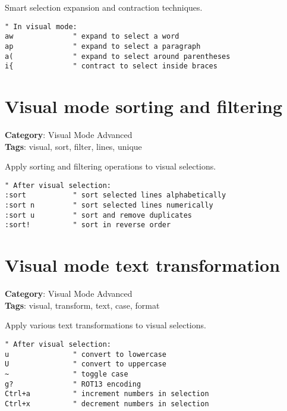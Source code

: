 {{{{{{{{{{{{{{{{{{Smart selection expansion and contraction techniques.

\begin{Exa*}{}
\begin{Verbatim}[fontsize=\footnotesize, breaklines, breakanywhere]
" In visual mode:
aw              " expand to select a word
ap              " expand to select a paragraph
a(              " expand to select around parentheses
i{              " contract to select inside braces
\end{Verbatim}
\end{Exa*}

\section{Visual mode sorting and filtering}

\textbf{Category}: Visual Mode Advanced\\ \textbf{Tags}: visual, sort, filter, lines, unique
\vspace{0.5cm}

Apply sorting and filtering operations to visual selections.

\begin{Exa*}{}
\begin{Verbatim}[fontsize=\footnotesize, breaklines, breakanywhere]
" After visual selection:
:sort           " sort selected lines alphabetically
:sort n         " sort selected lines numerically
:sort u         " sort and remove duplicates
:sort!          " sort in reverse order
\end{Verbatim}
\end{Exa*}

\section{Visual mode text transformation}

\textbf{Category}: Visual Mode Advanced\\ \textbf{Tags}: visual, transform, text, case, format
\vspace{0.5cm}

Apply various text transformations to visual selections.

\begin{Exa*}{}
\begin{Verbatim}[fontsize=\footnotesize, breaklines, breakanywhere]
" After visual selection:
u               " convert to lowercase
U               " convert to uppercase
~               " toggle case
g?              " ROT13 encoding
Ctrl+a          " increment numbers in selection
Ctrl+x          " decrement numbers in selection
\end{Verbatim}
\end{Exa*}

}}}}}}}}}}}}}}}}}}
